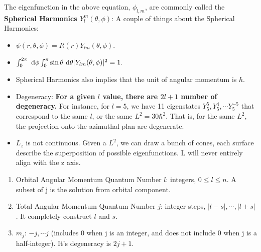 \documentclass{school-22.101-notes}
\begin{document}
The eigenfunction in the above equation, $\phi_{l,m}$, are commonly called the \textbf{Spherical Harmonics $Y_l^m (\theta, \phi)$}:
A couple of things about the Spherical Harmonics:
\begin{itemize}
\item $\psi( r, \theta, \phi) = R(r) Y_{lm} (\theta, \phi)$. 
\item $\int_0^{2\pi} \mbox{ }\mathrm{d} \phi \int_0^{\pi} \sin \theta \mbox{ }\mathrm{d} \theta |Y_{lm} (\theta, \phi) |^2 = 1.$
\item Spherical Harmonics also implies that the unit of angular momentum is $\hbar$.
\item Degeneracy: \textbf{For a given $l$ value, there are $2l+1$ number of degeneracy.} For instance, for $l=5$, we have 11 eigenstates $Y_5^5, Y_5^4, \cdots Y_5^{-5}$ that correspond to the same $l$, or the same $L^2 = 30 \hbar^2$. That is, for the same $L^2$, the projection onto the azimuthal plan are degenerate.  
\item $L_z$ is not continuous. Given a $L^2$, we can draw a bunch of cones, each surface describe the superposition of possible eigenfunctions. L will never entirely align with the z axis. 
\end{itemize}


\begin{enumerate}
\item Orbital Angular Momentum Quantum Number $l$: integers, $0 \le l \le n$. A subset of j is the solution from orbital component. 
\item Total Angular Momentum Quantum Number $j$: integer steps, $|l-s|, \cdots, |l+s|$. It completely construct $l$ and $s$. 
\item $m_j$: $-j, \cdots j$ (includes 0 when j is an integer, and does not include 0 when j is a half-integer). It's degeneracy is $2j+1$. 
\end{enumerate}
\end{document}

